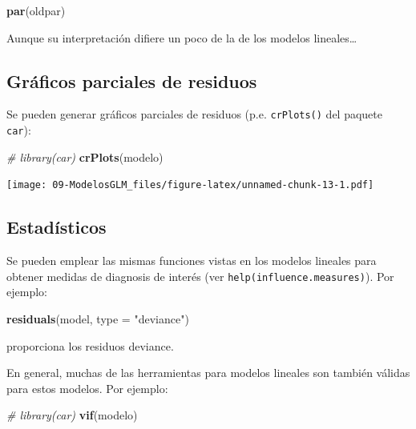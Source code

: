 \documentclass[]{book}
\newenvironment{Shaded}{\begin{snugshade}}{\end{snugshade}}
\newcommand{\KeywordTok}[1]{\textcolor[rgb]{0.13,0.29,0.53}{\textbf{#1}}}
\newcommand{\DataTypeTok}[1]{\textcolor[rgb]{0.13,0.29,0.53}{#1}}
\newcommand{\StringTok}[1]{\textcolor[rgb]{0.31,0.60,0.02}{#1}}
\newcommand{\CommentTok}[1]{\textcolor[rgb]{0.56,0.35,0.01}{\textit{#1}}}
\newcommand{\NormalTok}[1]{#1}
\begin{document}
\begin{Shaded}
\begin{Highlighting}[]
\KeywordTok{par}\NormalTok{(oldpar)}
\end{Highlighting}
\end{Shaded}

Aunque su interpretación difiere un poco de la de los modelos
lineales\ldots{}

\subsection{Gráficos parciales de
residuos}\label{graficos-parciales-de-residuos-1}

Se pueden generar gráficos parciales de residuos (p.e.
\texttt{crPlots()} del paquete \texttt{car}):

\begin{Shaded}
\begin{Highlighting}[]
\CommentTok{# library(car)}
\KeywordTok{crPlots}\NormalTok{(modelo)}
\end{Highlighting}
\end{Shaded}

\texttt{[image: 09-ModelosGLM\_files/figure-latex/unnamed-chunk-13-1.pdf]}

\subsection{Estadísticos}\label{estadisticos-1}

Se pueden emplear las mismas funciones vistas en los modelos lineales
para obtener medidas de diagnosis de interés (ver
\texttt{help(influence.measures)}). Por ejemplo:

\begin{Shaded}
\begin{Highlighting}[]
\KeywordTok{residuals}\NormalTok{(model, }\DataTypeTok{type =} \StringTok{"deviance"}\NormalTok{) }
\end{Highlighting}
\end{Shaded}

proporciona los residuos deviance.

En general, muchas de las herramientas para modelos lineales son también
válidas para estos modelos. Por ejemplo:

\begin{Shaded}
\begin{Highlighting}[]
\CommentTok{# library(car)}
\KeywordTok{vif}\NormalTok{(modelo)}
\end{Highlighting}
\end{Shaded}
\end{document}
